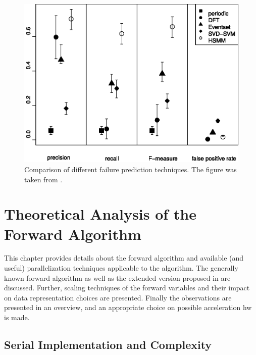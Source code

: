 \documentclass[mscthesis]{usiinfthesis}
\begin{document}
\begin{figure}
    \includegraphics[width=1\columnwidth]{./schema/results_salfner.eps}
    \caption{Comparison of different failure prediction techniques. The figure
        was taken from \cite{salfner08}.}
    \label{fig:results_salfner}
\end{figure}

\chapter{Theoretical Analysis of the Forward Algorithm}
\label{ch:analysis}
\glsresetall %

This chapter provides details about the forward algorithm and available (and
useful) parallelization techniques applicable to the algorithm. The generally
known forward algorithm as well as the extended version proposed in
\cite{salfner08} are discussed. Further, scaling techniques of the forward
variables and their impact on data representation choices are presented.
Finally the observations are presented in an overview, and an appropriate choice
on possible acceleration \gls{hw} is made.

\section{Serial Implementation and Complexity}
\label{ch:analysis_serial}
\end{document}
